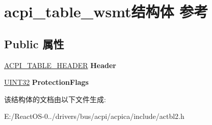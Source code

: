\hypertarget{structacpi__table__wsmt}{}\section{acpi\+\_\+table\+\_\+wsmt结构体 参考}
\label{structacpi__table__wsmt}
\subsection*{Public 属性}
\begin{DoxyCompactItemize}
\item 
\mbox{\label{structacpi__table__wsmt_a52cc22600f2877cc2bd9420d8f732417}} 
\hyperlink{structacpi__table__header}{A\+C\+P\+I\+\_\+\+T\+A\+B\+L\+E\+\_\+\+H\+E\+A\+D\+ER} {\bfseries Header}
\item 
\mbox{\label{structacpi__table__wsmt_ac434966cfa9873f1205ef3347473d3f9}} 
\hyperlink{_processor_bind_8h_ae1e6edbbc26d6fbc71a90190d0266018}{U\+I\+N\+T32} {\bfseries Protection\+Flags}
\end{DoxyCompactItemize}


该结构体的文档由以下文件生成\+:\begin{DoxyCompactItemize}
\item 
E\+:/\+React\+O\+S-\/0../drivers/bus/acpi/acpica/include/actbl2.\+h\end{DoxyCompactItemize}
